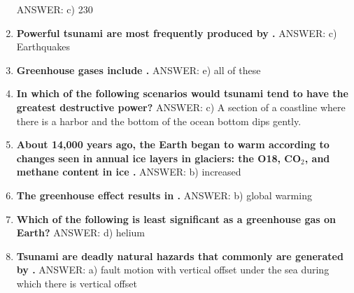 \documentclass[10pt]{article}
\newcommand{\Rivpt}{\rule{.1pt}{1pt}}
\begin{document}
\begin{enumerate}
{\begin{samepage}
{}
ANSWER: c)	230
\end{samepage}
}
\item {
\setlength{\itemsep}{0cm}
\setlength{\parskip}{.2cm}
\begin{samepage}
\textbf{
Powerful tsunami are most frequently produced by \makebox[1cm]{\Rivpt\hrulefill\Rivpt}.
}
ANSWER: c)	Earthquakes
\end{samepage}
}
\item {
\setlength{\itemsep}{0cm}
\setlength{\parskip}{.2cm}
\begin{samepage}
\textbf{
Greenhouse gases include \makebox[1cm]{\Rivpt\hrulefill\Rivpt}.
}
ANSWER: e) all of these
\end{samepage}
}
\item {
\setlength{\itemsep}{0cm}
\setlength{\parskip}{.2cm}
\begin{samepage}
\textbf{
In which of the following scenarios would tsunami tend to have the greatest destructive power?
}
ANSWER: c)	A section of a coastline where there is a harbor and the bottom of the ocean bottom dips gently.
\end{samepage}
}
\item {
\setlength{\itemsep}{0cm}
\setlength{\parskip}{.2cm}
\begin{samepage}
\textbf{
About 14,000 years ago, the Earth began to warm according to changes seen in annual ice layers in glaciers: the O18, CO\ensuremath{_2}, and methane content in ice \makebox[1cm]{\Rivpt\hrulefill\Rivpt}.
}
ANSWER: b) increased
\end{samepage}
}
\item {
\setlength{\itemsep}{0cm}
\setlength{\parskip}{.2cm}
\begin{samepage}
\textbf{
The greenhouse effect results in \makebox[1cm]{\Rivpt\hrulefill\Rivpt}.
}
ANSWER: b) global warming
\end{samepage}
}
\item {
\setlength{\itemsep}{0cm}
\setlength{\parskip}{.2cm}
\begin{samepage}
\textbf{
Which of the following is least significant as a greenhouse gas on Earth?
}
ANSWER: d) helium
\end{samepage}
}
\item {
\setlength{\itemsep}{0cm}
\setlength{\parskip}{.2cm}
\begin{samepage}
\textbf{
Tsunami are deadly natural hazards that commonly are generated by \makebox[1cm]{\Rivpt\hrulefill\Rivpt}.
}
ANSWER: a)	fault motion with vertical offset under the sea during which there is vertical offset

\end{samepage}}
\end{enumerate}
\end{document}

